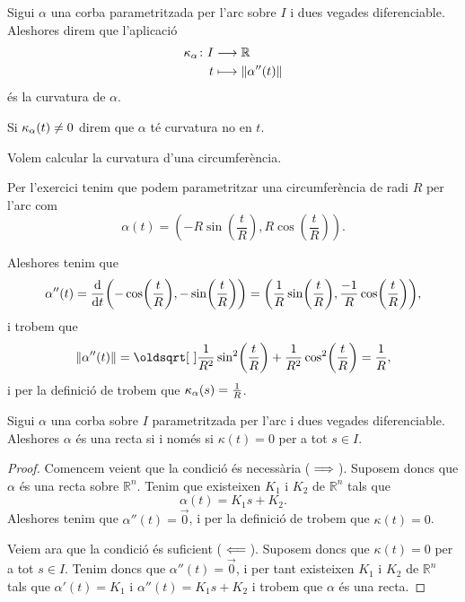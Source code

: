 \documentclass[../Apunts.tex]{subfiles}
\begin{document}
	\begin{definition}[Curvatura]
		\label{def:curvatura}
		Sigui \(\alpha\) una corba parametritzada per l'arc sobre \(I\) i dues vegades diferenciable. Aleshores direm que l'aplicació
		\begin{align*}
			\curvatura_{\alpha}\colon I&\longrightarrow\mathbb{R} \\
			t&\longmapsto\norm{\alpha''(t)}
		\end{align*}
		és la curvatura de \(\alpha\).
		
		Si \(\operatorname{\kappa}_{\alpha}(t)\neq0\) direm que \(\alpha\) té curvatura no \nulla{} en \(t\).
	\end{definition}
	\begin{example}
		\label{ex:curvatura de la circumferència}
		Volem calcular la curvatura d'una circumferència.%
		\begin{solution}
			Per l'exercici  tenim que podem parametritzar una circumferència de radi \(R\) per l'arc com
			\[\alpha(t)=\left(-R\sin\left(\frac{t}{R}\right),R\cos\left(\frac{t}{R}\right)\right).\]
			
			Aleshores tenim que
			\[\alpha''(t)=\frac{\diff}{\diff t}\left(-\cos\left(\frac{t}{R}\right),-\sin\left(\frac{t}{R}\right)\right)=\left(\frac{1}{R}\sin\left(\frac{t}{R}\right),\frac{-1}{R}\cos\left(\frac{t}{R}\right)\right),\]
			i trobem que
			\[\norm{\alpha''(t)}=\sqrt{\frac{1}{R^{2}}\sin^{2}\left(\frac{t}{R}\right)+\frac{1}{R^{2}}\cos^{2}\left(\frac{t}{R}\right)}=\frac{1}{R},\]
			i per la definició de  trobem que \(\operatorname{\kappa}_{\alpha}(s)=\frac{1}{R}\).
		\end{solution}
	\end{example}
	\begin{proposition}
		\label{prop:una corba té curvatura zero si i només si és una recta}
		Sigui \(\alpha\) una corba sobre \(I\) parametritzada per l'arc i dues vegades diferenciable. Aleshores \(\alpha\) és una recta si i només si \(\kappa(t)=0\) per a tot \(s\in I\).
		\begin{proof}
			Comencem veient que la condició és necessària (\(\implies\)). Suposem doncs que \(\alpha\) és una recta sobre \(\mathbb{R}^{n}\). Tenim que existeixen \(K_{1}\) i \(K_{2}\) de \(\mathbb{R}^{n}\) tals que
			\[\alpha(t)=K_{1}s+K_{2}.\]
			Aleshores tenim que \(\alpha''(t)=\vec{0}\), i per la definició de  trobem que \(\kappa(t)=0\).
			
			Veiem ara que la condició és suficient (\(\impliedby\)). Suposem doncs que \(\kappa(t)=0\) per a tot \(s\in I\). Tenim doncs que \(\alpha''(t)=\vec{0}\), i per tant existeixen \(K_{1}\) i \(K_{2}\) de \(\mathbb{R}^{n}\) tals que \(\alpha'(t)=K_{1}\) i \(\alpha''(t)=K_{1}s+K_{2}\) i trobem que \(\alpha\) és una recta.
		\end{proof}
	\end{proposition}
\end{document}
